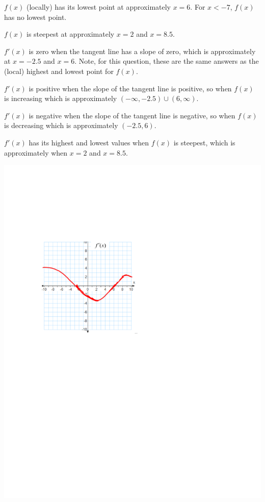 \documentclass[handout,nooutcomes]{ximera}
\begin{document}
\begin{problem}
\begin{freeResponse}
			$f(x)$ (locally) has its lowest point at approximately $x=6$.  For $x < -7$, $f(x)$ has no lowest point.
			  
			$f(x)$ is steepest at approximately $x=2$ and $x=8.5$.
			   
			$f'(x)$ is zero when the tangent line has a slope of zero, which is approximately at $x=-2.5$ and $x=6$.  Note, for this question, these are the same answers as the 					(local) highest and lowest point for $f(x)$.   
			   
			${f}'(x)$ is positive when the slope of the tangent line is positive, so when $f(x)$ is increasing which is approximately $(-\infty ,-2.5) \cup (6,\infty )$. 
			   
			${f}'(x)$ is negative when the slope of the tangent line is negative, so when $f(x)$is decreasing which is approximately $(-2.5,6)$.
			   
			${f}'(x)$ has its highest and lowest values when $f(x)$ is steepest, which is approximately when $x=2$ and $x = 8.5$. 
			   
			\begin{image}
			\includegraphics[trim= 170 410 250 190]{Figure4.pdf}
			\end{image}

		
		\end{freeResponse}
		
\end{problem}
\end{document}
